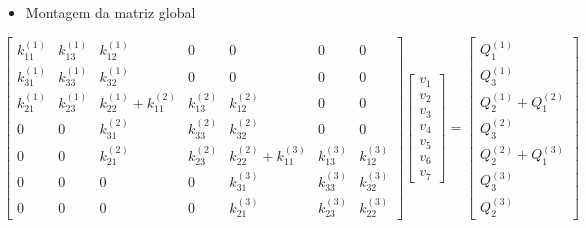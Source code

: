 \documentclass{article} %
\begin{document}
\begin{itemize}
	\item Montagem da matriz global
\end{itemize}
\begin{equation*}
\begin{bmatrix}
k_{11} ^{(1)}& k_{13} ^{(1)} & k_{12} ^{(1)}& 0& 0& 0& 0\\
k_{31} ^{(1)}& k_{33} ^{(1)} & k_{32} ^{(1)}& 0& 0& 0& 0\\
k_{21} ^{(1)}& k_{23} ^{(1)} & k_{22} ^{(1)}+k_{11} ^{(2)}&k_{13} ^{(2)}& k_{12} ^{(2)}& 0& 0\\
0&0& k_{31} ^{(2)} &k_{33} ^{(2)}& k_{32} ^{(2)}& 0& 0\\
0&0&k_{21} ^{(2)}& k_{23} ^{(2)}& k_{22} ^{(2)} +k_{11} ^{(3)}& k_{13} ^{(3)}& k_{12} ^{(3)}\\
0&0&0&0& k_{31} ^{(3)}& k_{33} ^{(3)}& k_{32} ^{(3)}\\
0&0&0&0&k_{21} ^{(3)}& k_{23} ^{(3)} & k_{22} ^{(3)}
\end{bmatrix}\begin{bmatrix}
v_1\\
v_2\\
v_3\\
v_4\\
v_5\\
v_6\\
v_7
\end{bmatrix}=\begin{bmatrix}
Q_1^{(1)}\\
Q_3^{(1)}\\
Q_2^{(1)}+Q_1^{(2)}\\
Q_3^{(2)}\\
Q_2^{(2)}+Q_1^{(3)}\\
Q_3^{(3)}\\
Q_2^{(3)}
\end{bmatrix}
\end{equation*}
\end{document}
